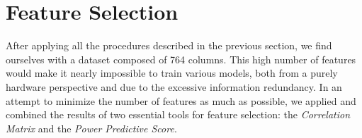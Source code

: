\newpage
\section{Feature Selection}\label{sec:featureselection}
After applying all the procedures described in the previous section,
we find ourselves with a dataset composed of 764 columns.
This high number of features would make it nearly impossible to train various models,
both from a purely hardware perspective and due to the excessive information redundancy.
In an attempt to minimize the number of features as much as possible,
we applied and combined the results of two essential tools for feature selection:
the \textit{Correlation Matrix} and the \textit{Power Predictive Score}.


